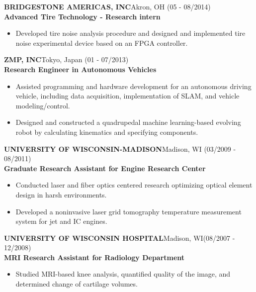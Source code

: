 \documentclass[11pt,letterpaper]{article}
\begin{document}
\MakeUppercase{\bf Bridgestone Americas, Inc}\hfill{Akron, OH}{ (05 - 08/2014)}\\
{\bf Advanced Tire Technology - Research intern}
\begin{itemize}
\item Developed tire noise analysis procedure and designed and implemented tire noise experimental device based on an FPGA controller.
\end{itemize}

\MakeUppercase{\bf ZMP, Inc}\hfill{Tokyo, Japan }{(01 - 07/2013)}\\
{\bf Research Engineer in Autonomous Vehicles}
\begin{itemize}
\item Assisted programming and hardware development for an autonomous driving vehicle, including data acquisition, implementation of SLAM, and vehicle modeling/control.
\item Designed and constructed a quadrupedal machine learning-based evolving robot by calculating kinematics and specifying components.
\end{itemize}

\MakeUppercase{\bf University of Wisconsin-Madison}\hfill{Madison, WI}{ (03/2009 - 08/2011)}\\
{\bf Graduate Research Assistant for Engine Research Center}
\begin{itemize}
\item Conducted laser and fiber optics centered research optimizing optical element design in harsh environments. 
\item Developed a noninvasive laser grid tomography temperature measurement system for jet and IC engines.
\end{itemize}

\MakeUppercase{\bf University of Wisconsin Hospital}\hfill{Madison, WI}{ {(08/2007 - 12/2008)}}\\
{\bf MRI Research Assistant for Radiology Department}
\begin{itemize}
\item Studied MRI-based knee analysis, quantified quality of the image, and determined change of cartilage volumes.
\end{itemize}

\vspace{-5mm}
\end{document}
